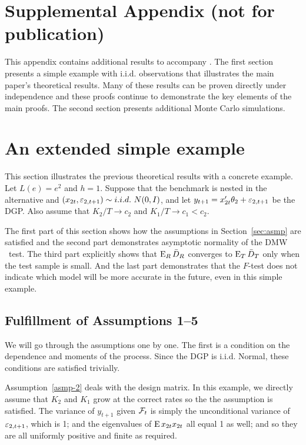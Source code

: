 \section*{Supplemental Appendix (not for publication)}

\noindent%
This appendix contains additional results to accompany
\citet{Cal:15b}. The first section presents a simple example with
i.i.d. observations that illustrates the main paper's theoretical
results. Many of these results can be proven directly under
independence and these proofs continue to demonstrate the key elements
of the main proofs. The second section presents additional Monte Carlo
simulations.

\section{An extended simple example}
\label{sec:example}

This section illustrates the previous theoretical results with a
concrete example. Let $L(e) = e^2$ and $h = 1$. Suppose that the benchmark is
nested in the alternative and $(x_{2t}, \varepsilon_{2,t+1}) \sim i.i.d.\
N(0,I)$, and let $y_{t+1} = x_{2t}'\theta_2 + \varepsilon_{2,t+1}$
be the DGP. Also assume that $K_2/T \to c_2$ and $K_1 / T \to c_1 <
c_2$.

The first part of this section shows how the assumptions in
Section~\ref{sec:asmp} are satisfied and the second part
demonstrates asymptotic normality of the DMW \oost\ test. The third
part explicitly shows that $\operatorname{E}_R \bar{D}_{R}$ converges to $\operatorname{E}_T \bar{D}_{T}$ only
when the test sample is small. And the last part demonstrates that the
$F$-test does not indicate which model will be more
accurate in the future, even in this simple example.

\subsection{Fulfillment of Assumptions 1--5}

We will go through the assumptions one by one. The first is
a condition on the dependence and moments of the process. Since the
DGP is i.i.d. Normal, these conditions are satisfied trivially.

Assumption~\ref{asmp-2} deals with the design matrix. In this example,
we directly assume that $K_2$ and $K_1$ grow at the correct rates so
the the assumption is satisfied. The variance of $y_{t+1}$ given
$\mathcal{F}_t$ is simply the unconditional variance of $\varepsilon_{2,t+1}$, which is
1; and the eigenvalues of $\operatorname{E} x_{2t} x_{2t}$ all equal 1 as well; and
so they are all uniformly positive and finite as required.

